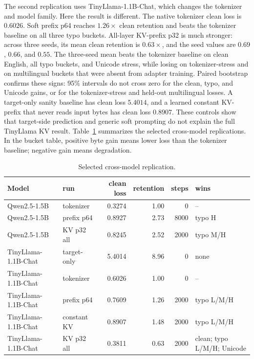 \documentclass[runningheads]{llncs}
\newcommand{\qwena}{Qwen2.5-1.5B}
\newcommand{\tinyllama}{TinyLlama-1.1B-Chat}
\begin{document}
The second replication uses \tinyllama{}, which changes the tokenizer and model family. Here the result is different. The native tokenizer clean loss is $0.6026$. Soft prefix p64 reaches $1.26\times$ clean retention and beats the tokenizer baseline on all three typo buckets. All-layer KV-prefix p32 is much stronger: across three seeds, its mean clean retention is $0.63\times$, and the seed values are $0.69$, $0.66$, and $0.55$. The three-seed mean beats the tokenizer baseline on clean English, all typo buckets, and Unicode stress, while losing on tokenizer-stress and on multilingual buckets that were absent from adapter training. Paired bootstrap confirms these signs: 95\% intervals do not cross zero for the clean, typo, and Unicode gains, or for the tokenizer-stress and held-out multilingual losses. A target-only sanity baseline has clean loss $5.4014$, and a learned constant KV-prefix that never reads input bytes has clean loss $0.8907$. These controls show that target-side prediction and generic soft prompting do not explain the full TinyLlama KV result.
Table~\ref{tab:qwen15} summarizes the selected cross-model replications.
In the bucket table, positive byte gain means lower loss than the tokenizer baseline; negative gain means degradation.

\begin{table}[t]
\centering
\caption{Selected cross-model replication.}
\label{tab:qwen15}
\footnotesize
\setlength{\tabcolsep}{2.4pt}
\begin{tabular}{llrrrp{2.6cm}}
\toprule
Model & run & clean loss & retention & steps & wins \\
\midrule
\qwena{} & tokenizer & 0.3274 & 1.00 & 0 & -- \\
\qwena{} & prefix p64 & 0.8927 & 2.73 & 8000 & typo H \\
\qwena{} & KV p32 all & 0.8245 & 2.52 & 2000 & typo M/H \\
\midrule
\tinyllama{} & target-only & 5.4014 & 8.96 & 0 & none \\
\tinyllama{} & tokenizer & 0.6026 & 1.00 & 0 & -- \\
\tinyllama{} & prefix p64 & 0.7609 & 1.26 & 2000 & typo L/M/H \\
\tinyllama{} & constant KV & 0.8907 & 1.48 & 2000 & typo L/M/H \\
\tinyllama{} & KV p32 all & 0.3811 & 0.63 & 2000 & clean; typo L/M/H; Unicode \\
\bottomrule
\end{tabular}
\end{table}
\end{document}

